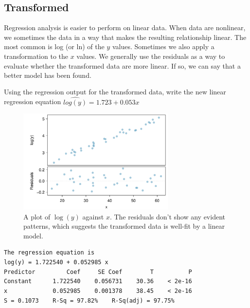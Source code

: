 \subsection{Transformed}

Regression analysis is easier to perform on linear data.  When data are nonlinear, we sometimes  the data in a way that makes the resulting relationship linear.  The most common  is log (or ln) of the $y$ values. Sometimes we also apply a transformation to the $x$ values.  We generally use the residuals as a way to evaluate whether the transformed data are more linear. If so, we can say that a better model has been found.

\begin{example}{Using the regression output for the transformed data, write the new linear regression equation}
$\widehat{log(y)} = 1.723 +0.053 x$
\end{example}

\begin{figure}
   \centering
   \includegraphics[width=0.7\textwidth]{ch_regr_simple_linear/figures/NeedsTransform/NeedsTransform-PostTransform}
   \caption{A plot of $\log(y)$ against $x$. The residuals don't show any evident patterns, which suggests the transformed data is well-fit by a linear model.}
   \label{NeedsTransform-PostTransform}
\end{figure}

\begin{tipBox}{\texttt{The regression equation is} \\

\texttt{log(y) = 1.722540 + 0.052985 x} \\

\texttt{Predictor \ \ \ \ \ \ \ \ Coef \ \ \ \ SE Coef \ \ \ \ \ \ \ T \ \ \ \ \ \ \ \ \ P} \\
\texttt{Constant \ \ \ \ \ 1.722540 \ \ \ 0.056731 \ \ \ 30.36 \ \ \ < 2e-16} \\
\texttt{x \ \ \ \ \ \ \ \ \ \ \ \ 0.052985 \ \ \ 0.001378 \ \ \ 38.45 \ \ \ < 2e-16} \\


\texttt{S = 0.1073\ \ \ \ R-Sq = 97.82\% \ \ \ R-Sq(adj) = 97.75\%}}
\end{tipBox}

